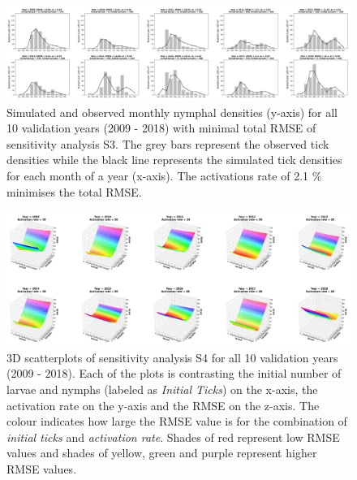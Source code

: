 \documentclass[a4paper, 11pt]{scrartcl}
\begin{document}
\begin{figure}
\centering
\includegraphics[width=\linewidth]{figures/independent_initial_ticks_with_beech.png}
\caption{Simulated and observed monthly nymphal densities (y-axis) for all 10 validation years (2009 - 2018) with minimal total RMSE of sensitivity analysis S3. The grey bars
represent the observed tick densities while the black line represents the simulated tick densities for each month of a year (x-axis). The activations rate of 2.1 \% minimises
the total RMSE.}
\label{fig:independent_initial_ticks_with_beech_rotated}
\end{figure}

\begin{figure}
\centering
\includegraphics[width=\linewidth]{figures/independent_initial_ticks_without_beech_error.png}
\caption{3D scatterplots of sensitivity analysis S4 for all 10 validation years (2009 - 2018). Each of the plots is contrasting the initial number of larvae and nymphs
(labeled as \textit{Initial Ticks}) on the x-axis, the activation rate on the y-axis and the RMSE on the z-axis. The colour indicates how large the RMSE value is for the
combination of \textit{initial ticks} and \textit{activation rate}. Shades of red represent low RMSE values and shades of yellow, green and purple represent higher RMSE values.}
\label{fig:independent_initial_ticks_without_beech_error_rotated}
\end{figure}
\end{document}
